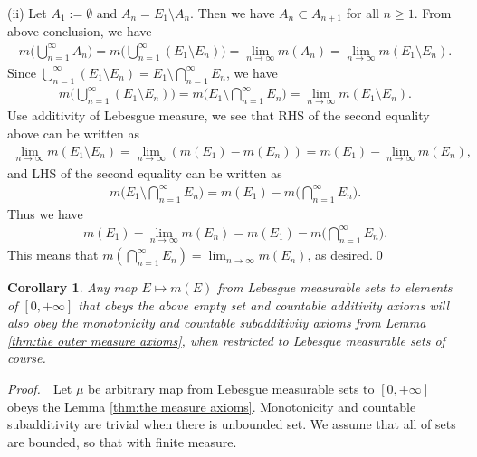 \documentclass{book}
\theoremstyle{defstyle}
\theoremstyle{thmstyle}
\newtheorem{corollary}[definition]{Corollary}
\newcommand{\pff}{\noindent\emph{Proof.}~~}
\begin{document}
(ii) Let $A_1 := \emptyset$ and $A_n = E_1 \setminus A_n$. Then we have $A_n \subset A_{n + 1}$ for all $n \geq 1$. From above conclusion, we have
    \begin{align*}
        m\Big(\bigcup_{n = 1}^{\infty}A_n\Big)
        = m\Big(\bigcup_{n = 1}^{\infty}(E_1 \setminus E_n)\Big)
        = \lim_{n \to \infty}m(A_n)
        = \lim_{n \to \infty}m(E_1 \setminus E_n).
    \end{align*}
Since $\bigcup_{n = 1}^{\infty}(E_1 \setminus E_n) = E_1 \setminus \bigcap_{n = 1}^{\infty}E_n$, we have
    \begin{align*}
        m\Big(\bigcup_{n = 1}^{\infty}(E_1 \setminus E_n)\Big)
        = m\Big(E_1 \setminus \bigcap_{n = 1}^{\infty}E_n\Big)
        = \lim_{n \to \infty}m(E_1 \setminus E_n).
    \end{align*}
Use additivity of Lebesgue measure, we see that RHS of the second equality above can be written as
    \begin{align*}
        \lim_{n \to \infty}m(E_1 \setminus E_n)
        = \lim_{n \to \infty}(m(E_1) - m(E_n))
        = m(E_1) - \lim_{n \to \infty}m(E_n),
    \end{align*}
and LHS of the second equality can be written as
    \begin{align*}
        m\Big(E_1 \setminus \bigcap_{n = 1}^{\infty}E_n\Big)
        = m(E_1) - m\Big(\bigcap_{n = 1}^{\infty}E_n\Big).
    \end{align*}
Thus we have
    \begin{align*}
        m(E_1) - \lim_{n \to \infty}m(E_n)
        = m(E_1) - m\Big(\bigcap_{n = 1}^{\infty}E_n\Big).
    \end{align*}
This means that $m(\bigcap_{n = 1}^{\infty}E_n) = \lim_{n \to \infty}m(E_n)$, as desired.\qed


\begin{corollary}\label{thm:monotonicity and countable subadditivity axiom of Lebesgue measure}
    Any map $E \mapsto m(E)$ from Lebesgue measurable sets to elements of $[0, +\infty]$ that obeys the above empty set and countable additivity axioms will also obey the monotonicity and countable subadditivity axioms from Lemma \ref{thm:the outer measure axioms}, when restricted to Lebesgue measurable sets of course.
\end{corollary}

\pff Let $\mu$ be arbitrary map from Lebesgue measurable sets to $[0, +\infty]$ obeys the Lemma \ref{thm:the measure axioms}. Monotonicity and countable subadditivity are trivial when there is unbounded set. We assume that all of sets are bounded, so that with finite measure.
\end{document}
